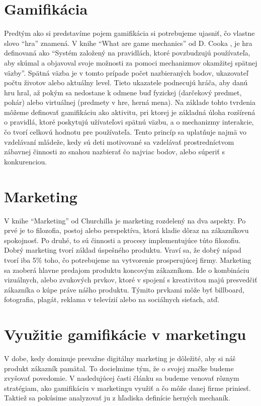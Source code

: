 \documentclass[10pt,twoside,slovak,a4paper]{article}
\begin{document}
\section{Gamifikácia}\label{gamifikacia}
	Predtým ako si predstavíme pojem gamifikácia si potrebujeme ujasniť, čo vlastne slovo “hra” znamená. V knihe “What are game mechanics”  od D. Cooka \cite{WhatAreGameMechanics}, je hra definovaná ako “Systém založený na pravidlách, ktoré povzbudzujú používateľa, aby skúmal a objavoval svoje možnosti za pomoci mechanizmov okamžitej spätnej väzby”. Spätná väzba je v tomto prípade počet nazbieraných bodov, ukazovateľ počtu životov alebo aktuálny level. Tieto ukazatele podnecujú hráča, aby danú hru hral, až pokým sa nedostane k odmene buď fyzickej (darčekový predmet, pohár) alebo virtuálnej (predmety v hre, herná mena). 
	Na základe tohto tvrdenia môžeme definovať gamifikáciu ako aktivitu, pri ktorej je základná úloha rozšírená o pravidlá, ktoré poskytujú užívateľovi spätnú väzbu, a o mechanizmy interakcie, čo tvorí celkovú hodnotu pre používateľa. Tento princíp sa uplatňuje najmä vo vzdelávaní mládeže, kedy sú deti motivované sa vzdelávať prostredníctvom zábavnej činnosti zo snahou nazbierať čo najviac bodov, alebo súperiť s konkurenciou.



\section{Marketing}\label{marketing}

	V knihe “Marketing” od Churchilla je marketing rozdelený na dva aspekty. \cite{churchill2017marketing}Po prvé je to filozofia, postoj alebo perspektíva, ktorá kladie dôraz na zákazníkovu spokojnosť. Po druhé, to sú činnosti a procesy implementujúce túto filozofiu.
	Dobrý marketing tvorí základ úspešného produktu. Vraví sa, že dobrý nápad tvorí iba 5\% toho, čo potrebujeme na vytvorenie prosperujúcej firmy. Marketing sa zaoberá hlavne predajom produktu koncovým zákazníkom. Ide o kombináciu vizuálnych, alebo zvukových prvkov, ktoré v spojení s kreativitou majú presvedčiť zákazníka o kúpe práve nášho produktu. Týmito prvkami môže byť billboard, fotografia, plagát, reklama v televízií alebo na sociálnych sieťach, atď.


\section{Využitie gamifikácie v marketingu}\label{pouzitie-v-marketingu}
V dobe, kedy dominuje prevažne digitálny marketing je dôležité, aby si náš produkt zákazník pamätal. To docielmime tým, že o svojej značke budeme zvyšovať povedomie. V nasledujúcej časti článku sa budeme venovať rôznym stratégiam, ako gamifikáciu v marketingu využiť a čo môže danej firme priniesť. Taktiež sa pokúsime analyzovať ju z hľadiska definície herných mechaník.
\end{document}
